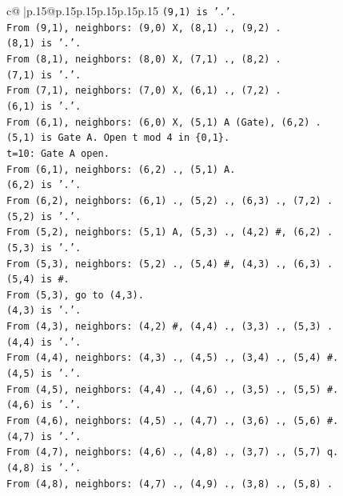 \documentclass{article}
\begin{document}
{\begin{supertabular}{c@{$\;$}|p{.15\linewidth}@{}p{.15\linewidth}p{.15\linewidth}p{.15\linewidth}p{.15\linewidth}p{.15\linewidth}}
{{{\texttt{(9,1) is '.'.} \\
\texttt{From (9,1), neighbors: (9,0) X, (8,1) ., (9,2) .} \\
\texttt{(8,1) is '.'.} \\
\texttt{From (8,1), neighbors: (8,0) X, (7,1) ., (8,2) .} \\
\texttt{(7,1) is '.'.} \\
\texttt{From (7,1), neighbors: (7,0) X, (6,1) ., (7,2) .} \\
\texttt{(6,1) is '.'.} \\
\texttt{From (6,1), neighbors: (6,0) X, (5,1) A (Gate), (6,2) .} \\
\texttt{(5,1) is Gate A. Open t mod 4 in \{0,1\}.} \\
\texttt{t=10: Gate A open.} \\
\texttt{From (6,1), neighbors: (6,2) ., (5,1) A.} \\
\texttt{(6,2) is '.'.} \\
\texttt{From (6,2), neighbors: (6,1) ., (5,2) ., (6,3) ., (7,2) .} \\
\texttt{(5,2) is '.'.} \\
\texttt{From (5,2), neighbors: (5,1) A, (5,3) ., (4,2) \#, (6,2) .} \\
\texttt{(5,3) is '.'.} \\
\texttt{From (5,3), neighbors: (5,2) ., (5,4) \#, (4,3) ., (6,3) .} \\
\texttt{(5,4) is \#.} \\
\texttt{From (5,3), go to (4,3).} \\
\texttt{(4,3) is '.'.} \\
\texttt{From (4,3), neighbors: (4,2) \#, (4,4) ., (3,3) ., (5,3) .} \\
\texttt{(4,4) is '.'.} \\
\texttt{From (4,4), neighbors: (4,3) ., (4,5) ., (3,4) ., (5,4) \#.} \\
\texttt{(4,5) is '.'.} \\
\texttt{From (4,5), neighbors: (4,4) ., (4,6) ., (3,5) ., (5,5) \#.} \\
\texttt{(4,6) is '.'.} \\
\texttt{From (4,6), neighbors: (4,5) ., (4,7) ., (3,6) ., (5,6) \#.} \\
\texttt{(4,7) is '.'.} \\
\texttt{From (4,7), neighbors: (4,6) ., (4,8) ., (3,7) ., (5,7) q.} \\
\texttt{(4,8) is '.'.} \\
\texttt{From (4,8), neighbors: (4,7) ., (4,9) ., (3,8) ., (5,8) .} \\
}}}
\end{supertabular}}
\end{document}
